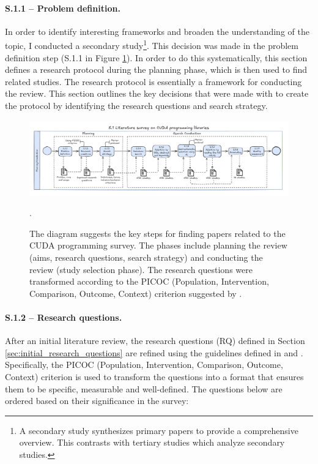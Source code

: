 \paragraph{S.1.1 -- Problem definition.}
In order to identify interesting frameworks and broaden the understanding of the topic, I conducted
a secondary study\footnote{A secondary study synthesizes primary papers to provide a comprehensive
	overview. This contrasts with tertiary studies which analyze secondary studies.}. This decision was
made in the problem definition step (S.1.1 in Figure \ref{fig:workflow-study}). In order to do this
systematically, this section defines a research protocol during the planning phase, which is then
used to find related studies. The research protocol is essentially a framework for conducting the
review. This section outlines the key decisions that were made with to create the protocol by
identifying the research questions and search strategy.

\begin{figure}[th]
	\centering
	\includegraphics[width=\linewidth]{figures/workflow3}
	\caption{The diagram suggests the key steps for finding papers related to the CUDA programming survey. The phases
		include planning the review (aims, research questions, search strategy) and conducting the review (study selection phase). The research questions
		were transformed according to the PICOC (Population, Intervention, Comparison, Outcome, Context) criterion suggested by \cite{keele_systematic_2007}.}.
	\label{fig:workflow-study}
\end{figure}

\paragraph{S.1.2 -- Research questions.}
After an initial literature review, the research questions (RQ) defined in Section
\ref{sec:initial_research_questions} are refined using the guidelines defined in
\cite{kitchenham_evidence-based_2015} and \cite{keele_systematic_2007}. Specifically, the PICOC
(Population, Intervention, Comparison, Outcome, Context) criterion is used to transform the
questions into a format that ensures them to be specific, measurable and well-defined. The
questions below are ordered based on their significance in the survey:

